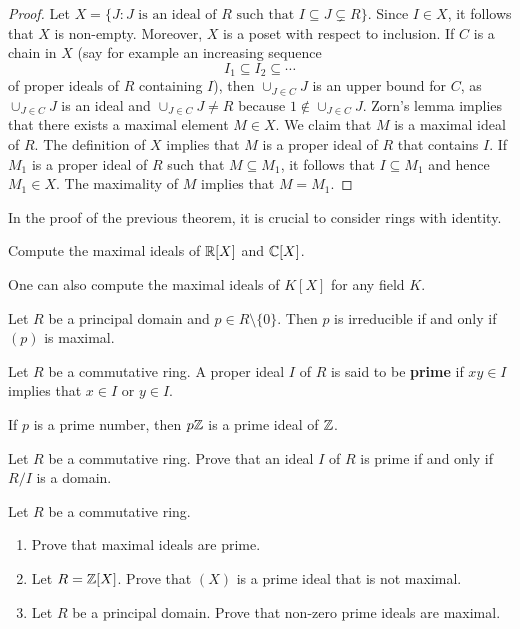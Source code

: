 \begin{proof}
	Let $X=\{J:J\text{ is an ideal of $R$ such that }I\subseteq J\subsetneq R\}$.
	Since $I\in X$, it follows that $X$ is non-empty. Moreover, $X$ is a poset
	with respect to inclusion. If $C$ is a chain in $X$ (say for example
	an increasing sequence
	\[
	I_1\subseteq I_2\subseteq\cdots
	\]
	of proper ideals of $R$ containing $I$), then 
	$\cup_{J\in C}J$ is an upper bound for $C$, as $\cup_{J\in C}J$ is an ideal and
	$\cup_{J\in C}J\ne R$ because $1\not\in\cup_{J\in C}J$. 	Zorn's lemma implies that
	there exists a maximal element $M\in X$. We claim that $M$ is a maximal ideal of $R$. The definition
	of $X$ implies that $M$ is a proper ideal of $R$ that contains $I$. If $M_1$ is a proper ideal of $R$
	such that $M\subseteq M_1$, it follows that $I\subseteq M_1$ and hence $M_1\in X$. The maximality
	of $M$ implies that $M=M_1$.  
\end{proof}

In the proof of the previous theorem, it is crucial to consider rings with 
identity. 

\begin{exercise}
	Compute the maximal ideals of $\mathbb{R}[X]$ and $\mathbb{C}[X]$. 	
\end{exercise}

One can also compute the maximal ideals of $K[X]$ for any field $K$. 

\begin{exercise}
	Let $R$ be a principal domain and $p\in R\setminus\{0\}$. 
	Then $p$ is irreducible 
	if and only if $(p)$ is maximal.	
\end{exercise}

\begin{definition}
Let $R$ be a commutative ring. A proper ideal $I$ of $R$ is said to be
\textbf{prime} if $xy\in I$ implies that $x\in I$ or $y\in I$. 
\end{definition}

If $p$ is a prime number, then $p\mathbb{Z}$ is a prime ideal of $\mathbb{Z}$.

\begin{exercise}
\label{xca:prime<=>domain}
    Let $R$ be a commutative ring. 
    Prove that an ideal $I$ of $R$ is prime if and only if $R/I$ is a domain. 
\end{exercise}

\begin{exercise}
Let $R$ be a commutative ring. 
\label{xca:maximal=>prime}
\begin{enumerate}
    \item Prove that maximal ideals are prime. 
    \item Let $R=\mathbb{Z}[X]$. Prove that $(X)$ is a prime ideal that is not maximal.
    \item Let $R$ be a principal domain. Prove that non-zero 
    prime ideals are maximal. 
\end{enumerate}
\end{exercise}

